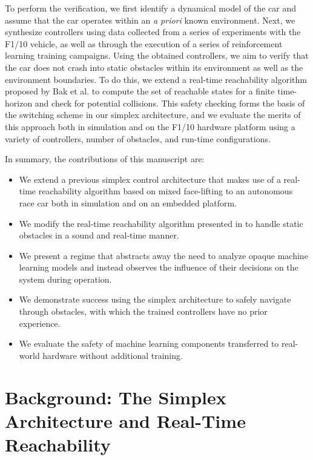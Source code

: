 \documentclass[manuscript,screen,review]{acmart}
\begin{document}
To perform the verification, we first identify a dynamical model of the car and assume that the car operates within an \textit{a priori} known environment. Next, we synthesize controllers using data collected from a series of experiments with the F1/10 vehicle, as well as through the execution of a series of reinforcement learning training campaigns. Using the obtained controllers, we aim to verify that the car does not crash into static obstacles within its environment as well as the environment boundaries. To do this, we extend a real-time reachability algorithm proposed by Bak et al. \cite{Bak2014,Johnson2016} to compute the set of reachable states for a finite time-horizon and check for potential collisions. This safety checking forms the basis of the switching scheme in our simplex architecture, and we evaluate the merits of this approach both in simulation and on the F1/10 hardware platform using a variety of controllers, number of obstacles, and run-time configurations.

In summary, the contributions of this manuscript are: \raggedbottom
\begin{itemize}%
    \item We extend a previous simplex control architecture that makes use of a real-time reachability algorithm based on mixed face-lifting to an autonomous race car both in simulation and on an embedded platform.
    \item We modify the real-time reachability algorithm presented in \cite{Bak2014} to handle static obstacles in a sound and real-time manner.
    \item We present a regime that abstracts away the need to analyze opaque machine learning models and instead observes the influence of their decisions on the system during operation.
    \item We demonstrate success using the simplex architecture to safely navigate through obstacles, with which the trained controllers have no prior experience.
    \item We evaluate the safety of machine learning components transferred to real-world hardware without additional training.
    
\end{itemize}%



\section{Background: The Simplex Architecture and Real-Time Reachability}
\end{document}
